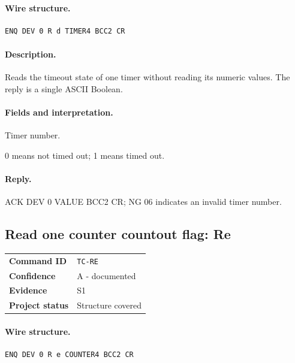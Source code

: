 \documentclass[10pt,letterpaper]{article}
\begin{document}
\paragraph{Wire structure.}
\begin{Verbatim}[breaklines=true,breakanywhere=true,fontsize=\small]
ENQ DEV 0 R d TIMER4 BCC2 CR
\end{Verbatim}
\paragraph{Description.} Reads the timeout state of one timer without reading its numeric values. The reply is a single ASCII Boolean.
\paragraph{Fields and interpretation.}
\begin{description}[style=nextline,leftmargin=3.2cm,labelwidth=3.0cm,font=\normalfont\bfseries]
\item[TIMER4] Timer number.
\item[VALUE] 0 means not timed out; 1 means timed out.
\end{description}
\paragraph{Reply.} ACK DEV 0 VALUE BCC2 CR; NG 06 indicates an invalid timer number.

\subsection{Read one counter countout flag: Re}
\begin{tabularx}{\textwidth}{@{}>{\bfseries}p{2.8cm}X@{}}
Command ID & \texttt{TC-RE} \\
Confidence & A - documented \\
Evidence & S1 \\
Project status & Structure covered \\
\end{tabularx}
\vspace{0.35em}
\paragraph{Wire structure.}
\begin{Verbatim}[breaklines=true,breakanywhere=true,fontsize=\small]
ENQ DEV 0 R e COUNTER4 BCC2 CR
\end{Verbatim}
\end{document}
